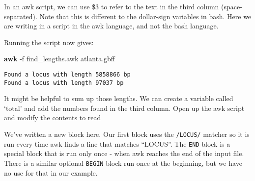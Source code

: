 \documentclass[
]{book}
\newenvironment{Shaded}{\begin{snugshade}}{\end{snugshade}}
\newcommand{\AttributeTok}[1]{\textcolor[rgb]{0.13,0.29,0.53}{#1}}
\newcommand{\ControlFlowTok}[1]{\textcolor[rgb]{0.13,0.29,0.53}{\textbf{#1}}}
\newcommand{\DataTypeTok}[1]{\textcolor[rgb]{0.13,0.29,0.53}{#1}}
\newcommand{\FunctionTok}[1]{\textcolor[rgb]{0.13,0.29,0.53}{\textbf{#1}}}
\newcommand{\KeywordTok}[1]{\textcolor[rgb]{0.13,0.29,0.53}{\textbf{#1}}}
\newcommand{\NormalTok}[1]{#1}
\newcommand{\OperatorTok}[1]{\textcolor[rgb]{0.81,0.36,0.00}{\textbf{#1}}}
\newcommand{\OtherTok}[1]{\textcolor[rgb]{0.56,0.35,0.01}{#1}}
\newcommand{\SpecialStringTok}[1]{\textcolor[rgb]{0.31,0.60,0.02}{#1}}
\newcommand{\StringTok}[1]{\textcolor[rgb]{0.31,0.60,0.02}{#1}}
\begin{document}
In an awk script, we can use \$3 to refer to the text in the third column (space-separated). Note that this is different to the dollar-sign variables in bash. Here we are writing in a script in the awk language, and not the bash language.

\begin{Shaded}
\end{Shaded}

Running the script now gives:

\begin{Shaded}
\begin{Highlighting}[]
\FunctionTok{awk} \AttributeTok{{-}f}\NormalTok{ find\_lengths.awk atlanta.gbff}
\end{Highlighting}
\end{Shaded}

\begin{verbatim}
Found a locus with length 5858866 bp
Found a locus with length 97037 bp
\end{verbatim}

It might be helpful to sum up those lengths. We can create a variable called `total' and add the numbers found in the third column. Open up the awk script and modify the contents to read

\begin{Shaded}
\end{Shaded}

We've written a new block here. Our first block uses the \texttt{/LOCUS/} matcher so it is run every time awk finds a line that matches ``LOCUS''. The \texttt{END} block is a special block that is run only once - when awk reaches the end of the input file. There is a similar optional \texttt{BEGIN} block run once at the beginning, but we have no use for that in our example.
\end{document}
